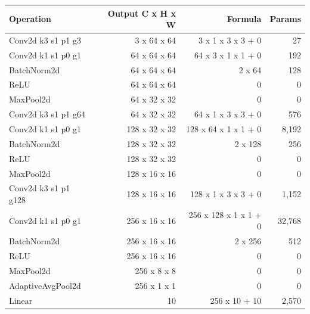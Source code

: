 \begin{tabular}{lrrr}
\toprule
Operation & Output C x H x W & Formula & Params \\
\midrule
Conv2d k3 s1 p1 g3 & 3 x 64 x 64 & 3 x 1 x 3 x 3 + 0 & 27 \\
Conv2d k1 s1 p0 g1 & 64 x 64 x 64 & 64 x 3 x 1 x 1 + 0 & 192 \\
BatchNorm2d & 64 x 64 x 64 & 2 x 64 & 128 \\
ReLU & 64 x 64 x 64 & 0 & 0 \\
MaxPool2d & 64 x 32 x 32 & 0 & 0 \\
Conv2d k3 s1 p1 g64 & 64 x 32 x 32 & 64 x 1 x 3 x 3 + 0 & 576 \\
Conv2d k1 s1 p0 g1 & 128 x 32 x 32 & 128 x 64 x 1 x 1 + 0 & 8,192 \\
BatchNorm2d & 128 x 32 x 32 & 2 x 128 & 256 \\
ReLU & 128 x 32 x 32 & 0 & 0 \\
MaxPool2d & 128 x 16 x 16 & 0 & 0 \\
Conv2d k3 s1 p1 g128 & 128 x 16 x 16 & 128 x 1 x 3 x 3 + 0 & 1,152 \\
Conv2d k1 s1 p0 g1 & 256 x 16 x 16 & 256 x 128 x 1 x 1 + 0 & 32,768 \\
BatchNorm2d & 256 x 16 x 16 & 2 x 256 & 512 \\
ReLU & 256 x 16 x 16 & 0 & 0 \\
MaxPool2d & 256 x 8 x 8 & 0 & 0 \\
AdaptiveAvgPool2d & 256 x 1 x 1 & 0 & 0 \\
Linear & 10 & 256 x 10 + 10 & 2,570 \\
\bottomrule
\end{tabular}
